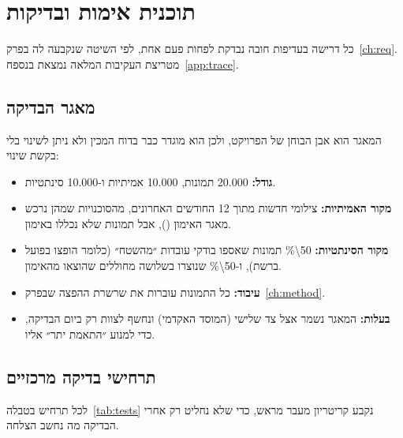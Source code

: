 \chapter{תוכנית אימות ובדיקות}\label{ch:verif}

כל דרישה בעדיפות חובה נבדקת לפחות פעם אחת, לפי השיטה שנקבעה לה בפרק~\ref{ch:req}. מטריצת העקיבות המלאה נמצאת בנספח~\ref{app:trace}.

\section{מאגר הבדיקה }\label{sec:bench}
המאגר הוא אבן הבוחן של הפרויקט, ולכן הוא מוגדר כבר בדוח המכין ולא ניתן לשינוי בלי בקשת שינוי:
\begin{itemize}
\item \textbf{גודל:} \num{20,000} תמונות, \num{10,000} אמיתיות ו-\num{10,000} סינתטיות.
\item \textbf{מקור האמיתיות:} צילומי חדשות מתוך \num{12} החודשים האחרונים, מהסוכנויות שמהן נרכש מאגר האימון (), אבל תמונות שלא נכללו באימון.
\item \textbf{מקור הסינתטיות:} \num{50\%} תמונות שאספו בודקי עובדות ״מהשטח״ (כלומר הופצו בפועל ברשת), ו-\num{50\%} שנוצרו בשלושה מחוללים שהוצאו מהאימון.
\item \textbf{עיבוד:} כל התמונות עוברות את שרשרת ההפצה שבפרק~\ref{ch:method}.
\item \textbf{בעלות:} המאגר נשמר אצל צד שלישי (המוסד האקדמי) ונחשף לצוות רק ביום הבדיקה, כדי למנוע ״התאמת יתר״ אליו.
\end{itemize}

\section{תרחישי בדיקה מרכזיים}
\small

לכל תרחיש בטבלה~\ref{tab:tests} נקבע קריטריון מעבר מראש, כדי שלא נחליט רק אחרי הבדיקה מה נחשב הצלחה.

